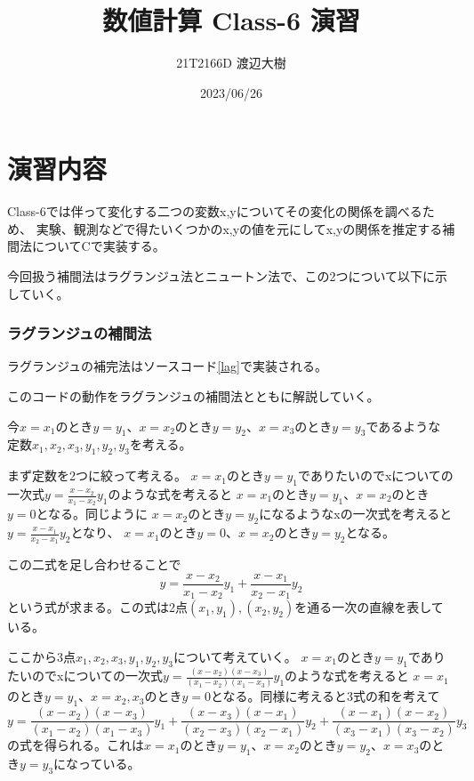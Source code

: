 \documentclass[a4paper,11pt,dvipdfmx]{jsarticle}
\begin{document}
\title{数値計算 Class-6 演習}
\author{21T2166D 渡辺大樹}
\date{2023/06/26}
\maketitle

\section{演習内容}
Class-6では伴って変化する二つの変数x,yについてその変化の関係を調べるため、
実験、観測などで得たいくつかのx,yの値を元にしてx,yの関係を推定する補間法についてCで実装する。

今回扱う補間法はラグランジュ法とニュートン法で、この2つについて以下に示していく。
\subsubsection{ラグランジュの補間法}
ラグランジュの補完法はソースコード\ref{lag}で実装される。


このコードの動作をラグランジュの補間法とともに解説していく。

今$x=x_1$のとき$y=y_1$、$x=x_2$のとき$y=y_2$、$x=x_3$のとき$y=y_3$であるような
定数$x_1,x_2,x_3,y_1,y_2,y_3$を考える。

まず定数を2つに絞って考える。
$x=x_1$のとき$y=y_1$でありたいのでxについての一次式$y=\frac{x-x_2}{x_1-x_2}y_1$のような式を考えると
$x=x_1$のとき$y=y_1$、$x=x_2$のとき$y=0$となる。同じように
$x=x_2$のとき$y=y_2$になるようなxの一次式を考えると$y=\frac{x-x_1}{x_2-x_1}y_2$となり、
$x=x_1$のとき$y=0$、$x=x_2$のとき$y=y_2$となる。

この二式を足し合わせることで
\begin{equation*}
    y=\frac{x-x_2}{x_1-x_2}y_1 + \frac{x-x_1}{x_2-x_1}y_2
\end{equation*}
という式が求まる。この式は2点$(x_1,y_1),(x_2,y_2)$を通る一次の直線を表している。

ここから3点$x_1,x_2,x_3,y_1,y_2,y_3$について考えていく。
$x=x_1$のとき$y=y_1$でありたいのでxについての一次式$y=\frac{(x-x_2)(x-x_3)}{(x_1-x_2)(x_1-x_3)}y_1$のような式を考えると
$x=x_1$のとき$y=y_1$、$x=x_2,x_3$のとき$y=0$となる。同様に考えると3式の和を考えて
\begin{equation*}
    y=\frac{(x-x_2)(x-x_3)}{(x_1-x_2)(x_1-x_3)}y_1 + \frac{(x-x_3)(x-x_1)}{(x_2-x_3)(x_2-x_1)}y_2 + \frac{(x-x_1)(x-x_2)}{(x_3-x_1)(x_3-x_2)}y_3
\end{equation*}
の式を得られる。これは$x=x_1$のとき$y=y_1$、$x=x_2$のとき$y=y_2$、$x=x_3$のとき$y=y_3$になっている。
\end{document}

